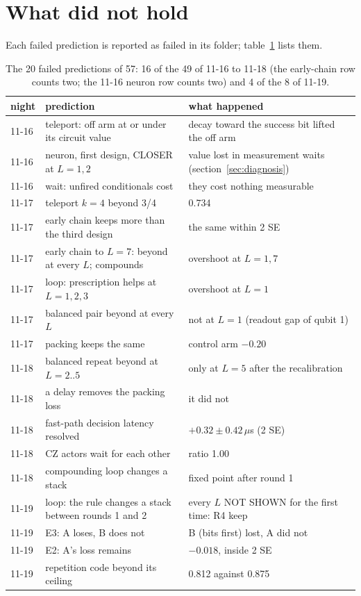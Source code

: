 \documentclass[10pt,a4paper]{article}
\begin{document}
\section{What did not hold}\label{sec:failed}
Each failed prediction is reported as failed in its folder; table~\ref{tab:failed} lists them.
\begin{table}[H]
\centering\small
\begin{tabular}{@{}lll@{}}
\toprule
night & prediction & what happened \\
\midrule
11-16 & teleport: off arm at or under its circuit value & decay toward the success bit lifted the off arm \\
11-16 & neuron, first design, CLOSER at $L = 1, 2$ & value lost in measurement waits (section~\ref{sec:diagnosis}) \\
11-16 & wait: unfired conditionals cost & they cost nothing measurable \\
11-17 & teleport $k = 4$ beyond 3/4 & 0.734 \\
11-17 & early chain keeps more than the third design & the same within 2 SE \\
11-17 & early chain to $L = 7$: beyond at every $L$; compounds & overshoot at $L = 1, 7$ \\
11-17 & loop: prescription helps at $L = 1, 2, 3$ & overshoot at $L = 1$ \\
11-17 & balanced pair beyond at every $L$ & not at $L = 1$ (readout gap of qubit 1) \\
11-17 & packing keeps the same & control arm $-0.20$ \\
11-18 & balanced repeat beyond at $L = 2..5$ & only at $L = 5$ after the recalibration \\
11-18 & a delay removes the packing loss & it did not \\
11-18 & fast-path decision latency resolved & $+0.32 \pm 0.42\,\mu$s (2 SE) \\
11-18 & CZ actors wait for each other & ratio 1.00 \\
11-18 & compounding loop changes a stack & fixed point after round 1 \\
11-19 & loop: the rule changes a stack between rounds 1 and 2 & every $L$ NOT SHOWN for the first time: R4 keep \\
11-19 & E3: A loses, B does not & B (bits first) lost, A did not \\
11-19 & E2: A's loss remains & $-0.018$, inside 2 SE \\
11-19 & repetition code beyond its ceiling & 0.812 against 0.875 \\
\bottomrule
\end{tabular}
\caption{The 20 failed predictions of 57: 16 of the 49 of 11-16 to 11-18 (the early-chain row counts two;
the 11-16 neuron row counts two) and 4 of the 8 of 11-19.}
\label{tab:failed}
\end{table}
\end{document}
